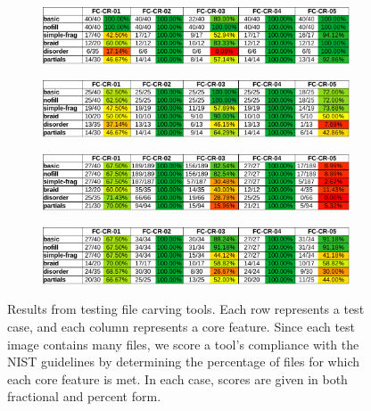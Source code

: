 \begin{figure}
    \centering

    \begin{subfigure}{\linewidth}
        \includegraphics[width=\linewidth]{fig/photorec_results_carve.pdf}
    \end{subfigure}
    \begin{subfigure}{\linewidth}
        \includegraphics[width=\linewidth]{fig/foremost_results_carve.pdf}
    \end{subfigure}
    \begin{subfigure}{\linewidth}
        \includegraphics[width=\linewidth]{fig/scalpel_results_carve.pdf}
    \end{subfigure}
    \begin{subfigure}{\linewidth}
        \includegraphics[width=\linewidth]{fig/axiom_results_carve.pdf}
    \end{subfigure}
        
    \caption{
    Results from testing file carving tools. 
    Each row represents a test case, and each column represents a core feature. 
    Since each test image contains many files, we score a tool's compliance with the NIST guidelines by determining the percentage of files for which each core feature is met.
    In each case, scores are given in both fractional and percent form.
    }
    \label{fig:results_carve}
\end{figure}

